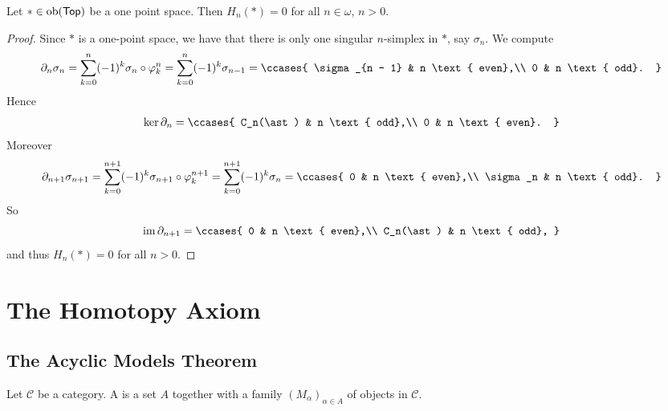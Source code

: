 \begin{proposition}
	Let $\ast \in \operatorname{ob}(\mathsf{Top})$ be a one point space. Then $H_n(\ast) = 0$ for all $n \in \omega$, $n > 0$.
\end{proposition}

\begin{proof}
	Since $\ast$ is a one-point space, we have that there is only one singular $n$-simplex in $\ast$, say $\sigma_n$. We compute
	\begin{equation*}
		\partial_n \sigma_n = \sum_{k = 0}^n(-1)^k \sigma_n \circ \varphi^n_k = \sum_{k = 0}^n (-1)^k\sigma_{n - 1} = \ccases{
			\sigma_{n - 1} & n \text{ even},\\
			0 & n \text{ odd}.
		}
	\end{equation*}
	Hence
	\begin{equation*}
		\ker \partial_n = \ccases{
			C_n(\ast) & n \text{ odd},\\
			0 & n \text{ even}.
		}
	\end{equation*}
	Moreover
	\begin{equation*}
		\partial_{n+1}\sigma_{n + 1} = \sum_{k = 0}^{n + 1}(-1)^k \sigma_{n + 1} \circ \varphi^{n+1}_k = \sum_{k = 0}^{n + 1} (-1)^k \sigma_n = \ccases{
			0 & n \text{ even},\\
			\sigma_n & n \text{ odd}.
		}
	\end{equation*}
	So
	\begin{equation*}
		\im \partial_{n + 1} = \ccases{
			0 & n \text{ even},\\
			C_n(\ast) & n \text{ odd},
		}
	\end{equation*}
	and thus $H_n(\ast) = 0$ for all $n > 0$.
\end{proof}

\section*{The Homotopy Axiom}
\subsection*{The Acyclic Models Theorem}
\begin{definition}[Models]
	Let $\mathcal{C}$ be a category. A  is a set $A$ together with a family $(M_\alpha)_{\alpha \in A}$ of objects in $\mathcal{C}$.
\end{definition}

